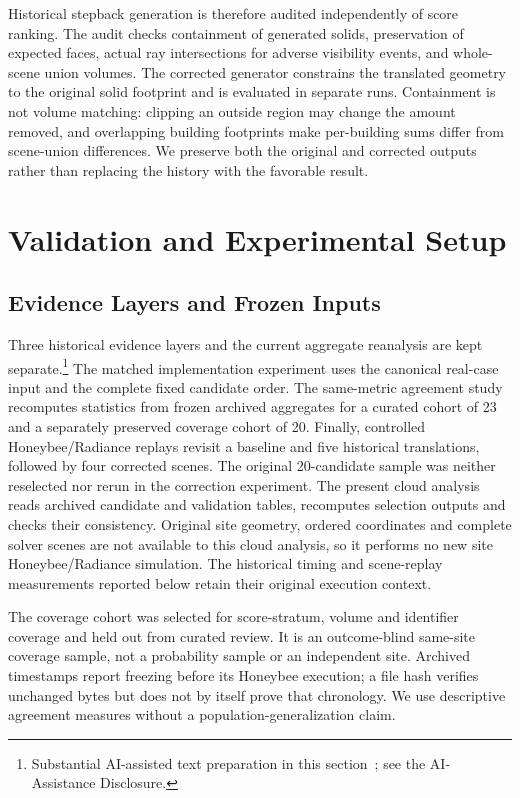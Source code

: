 \documentclass{llncs}
\newcommand{\aidraft}{\footnote{Substantial AI-assisted text preparation in this section~\cite{openai2026}; see the AI-Assistance Disclosure.}}
\begin{document}
Historical stepback generation is therefore audited independently of score ranking. The audit checks containment of generated solids, preservation of expected faces, actual ray intersections for adverse visibility events, and whole-scene union volumes. The corrected generator constrains the translated geometry to the original solid footprint and is evaluated in separate runs. Containment is not volume matching: clipping an outside region may change the amount removed, and overlapping building footprints make per-building sums differ from scene-union differences. We preserve both the original and corrected outputs rather than replacing the history with the favorable result.

\section{Validation and Experimental Setup}
\subsection{Evidence Layers and Frozen Inputs}
Three historical evidence layers and the current aggregate reanalysis are kept separate.\aidraft{} The matched implementation experiment uses the canonical real-case input and the complete fixed candidate order. The same-metric agreement study recomputes statistics from frozen archived aggregates for a curated cohort of 23 and a separately preserved coverage cohort of 20. Finally, controlled Honeybee/Radiance replays revisit a baseline and five historical translations, followed by four corrected scenes. The original 20-candidate sample was neither reselected nor rerun in the correction experiment. The present cloud analysis reads archived candidate and validation tables, recomputes selection outputs and checks their consistency. Original site geometry, ordered coordinates and complete solver scenes are not available to this cloud analysis, so it performs no new site Honeybee/Radiance simulation. The historical timing and scene-replay measurements reported below retain their original execution context.

The coverage cohort was selected for score-stratum, volume and identifier coverage and held out from curated review. It is an outcome-blind same-site coverage sample, not a probability sample or an independent site. Archived timestamps report freezing before its Honeybee execution; a file hash verifies unchanged bytes but does not by itself prove that chronology. We use descriptive agreement measures without a population-generalization claim.
\end{document}
